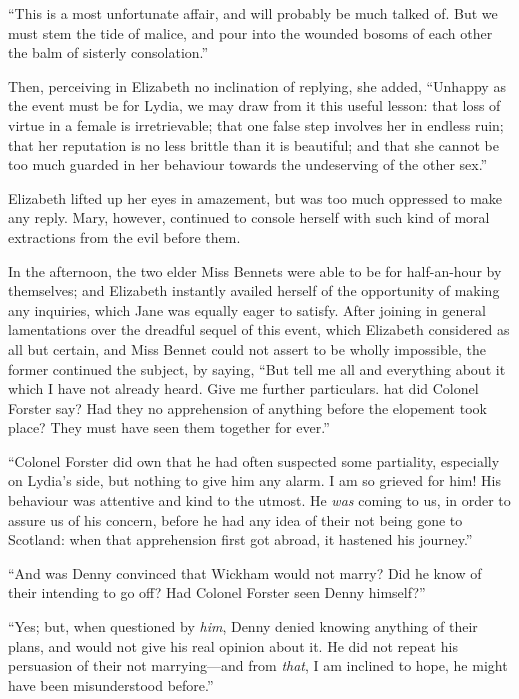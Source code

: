 ``This is a most unfortunate affair, and will probably be much
talked of.  But we must stem the tide of malice, and pour into
the wounded bosoms of each other the balm of sisterly consolation.''

Then, perceiving in Elizabeth no inclination of replying, she
added, ``Unhappy as the event must be for Lydia, we may draw
from it this useful lesson: that loss of virtue in a female is
irretrievable; that one false step involves her in endless ruin;
that her reputation is no less brittle than it is beautiful; and
that she cannot be too much guarded in her behaviour towards the
undeserving of the other sex.''

Elizabeth lifted up her eyes in amazement, but was too much
oppressed to make any reply.  Mary, however, continued to
console herself with such kind of moral extractions from the
evil before them.

In the afternoon, the two elder Miss Bennets were able to be
for half-an-hour by themselves; and Elizabeth instantly availed
herself of the opportunity of making any inquiries, which Jane
was equally eager to satisfy.  After joining in general
lamentations over the dreadful sequel of this event, which
Elizabeth considered as all but certain, and Miss Bennet could
not assert to be wholly impossible, the former continued the
subject, by saying, ``But tell me all and everything about it
which I have not already heard.  Give me further particulars.
hat did Colonel Forster say?  Had they no apprehension of
anything before the elopement took place?  They must have seen
them together for ever.''

``Colonel Forster did own that he had often suspected some
partiality, especially on Lydia's side, but nothing to give him any
alarm.  I am so grieved for him!  His behaviour was attentive and
kind to the utmost.  He \emph{was} coming to us, in order to assure us
of his concern, before he had any idea of their not being gone to
Scotland: when that apprehension first got abroad, it hastened
his journey.''

``And was Denny convinced that Wickham would not marry?  Did
he know of their intending to go off?  Had Colonel Forster
seen Denny himself?''

``Yes; but, when questioned by \emph{him}, Denny denied knowing
anything of their plans, and would not give his real opinion
about it.  He did not repeat his persuasion of their not
marrying---and from \emph{that}, I am inclined to hope, he might
have been misunderstood before.''

